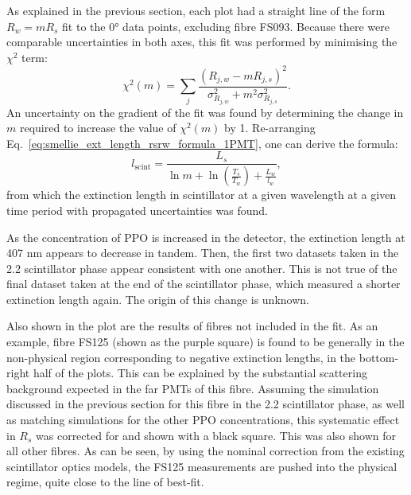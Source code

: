 As explained in the previous section, each plot had a straight line of the form $R_{w} = mR_{s}$ fit to the \ang{0} data points, excluding fibre FS093. Because there were comparable uncertainties in both axes, this fit was performed by minimising the $\chi^{2}$ term:
\begin{equation}
    \chi^{2}(m) = \sum_{j}\frac{\left(R_{j,w} - mR_{j,s}\right)^{2}}{\sigma^{2}_{R_{j,w}} + m^{2}\sigma^{2}_{R_{j,s}}}.
\end{equation}
An uncertainty on the gradient of the fit was found by determining the change in $m$ required to increase the value of $\chi^{2}(m)$ by 1. Re-arranging Eq.~\ref{eq:smellie_ext_length_rsrw_formula_1PMT}, one can derive the formula:
\begin{equation}
    l_{\mathrm{scint}} = 
    \frac{
        L_{s}
        }{
        \ln{m}
        + \ln\left(
            \frac{T_{s}}{T_{w}}
        \right)
        + \frac{L_{w}}{l_{w}}
    },
\end{equation}
from which the extinction length in scintillator at a given wavelength at a given time period with propagated uncertainties was found.

As the concentration of PPO is increased in the detector, the extinction length at 407 nm appears to decrease in tandem. Then, the first two datasets taken in the \SI{2.2}{\gpl} scintillator phase appear consistent with one another. This is not true of the final dataset taken at the end of the scintillator phase, which measured a shorter extinction length again. The origin of this change is unknown.

Also shown in the plot are the results of fibres not included in the fit. As an example, fibre FS125 (shown as the purple square) is found to be generally in the non-physical region corresponding to negative extinction lengths, in the bottom-right half of the plots. This can be explained by the substantial scattering background expected in the far PMTs of this fibre. Assuming the simulation discussed in the previous section for this fibre in the \SI{2.2}{\gpl} scintillator phase, as well as matching simulations for the other PPO concentrations, this systematic effect in $R_{s}$ was corrected for and shown with a black square. This was also shown for all other fibres. As can be seen, by using the nominal correction from the existing scintillator optics models, the FS125 measurements are pushed into the physical regime, quite close to the line of best-fit.

